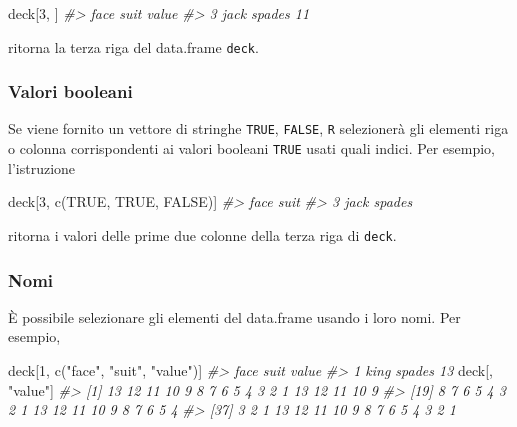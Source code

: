 \documentclass[
]{memoir}
\newenvironment{Shaded}{\begin{snugshade}}{\end{snugshade}}
\newcommand{\CommentTok}[1]{\textcolor[rgb]{0.56,0.35,0.01}{\textit{#1}}}
\newcommand{\ConstantTok}[1]{\textcolor[rgb]{0.00,0.00,0.00}{#1}}
\newcommand{\DecValTok}[1]{\textcolor[rgb]{0.00,0.00,0.81}{#1}}
\newcommand{\FunctionTok}[1]{\textcolor[rgb]{0.00,0.00,0.00}{#1}}
\newcommand{\NormalTok}[1]{#1}
\newcommand{\StringTok}[1]{\textcolor[rgb]{0.31,0.60,0.02}{#1}}
\theoremstyle{definition}
\theoremstyle{definition}
\theoremstyle{definition}
\theoremstyle{definition}
\theoremstyle{remark}
\begin{document}
\begin{Shaded}
\begin{Highlighting}[]
\NormalTok{deck[}\DecValTok{3}\NormalTok{, ]}
\CommentTok{\#\textgreater{}   face   suit value}
\CommentTok{\#\textgreater{} 3 jack spades    11}
\end{Highlighting}
\end{Shaded}

ritorna la terza riga del data.frame \texttt{deck}.

\hypertarget{valori-booleani}{%
\subsubsection{Valori booleani}\label{valori-booleani}}

Se viene fornito un vettore di stringhe \texttt{TRUE}, \texttt{FALSE}, \texttt{R} selezionerà
gli elementi riga o colonna corrispondenti ai valori booleani \texttt{TRUE}
usati quali indici. Per esempio, l'istruzione

\begin{Shaded}
\begin{Highlighting}[]
\NormalTok{deck[}\DecValTok{3}\NormalTok{, }\FunctionTok{c}\NormalTok{(}\ConstantTok{TRUE}\NormalTok{, }\ConstantTok{TRUE}\NormalTok{, }\ConstantTok{FALSE}\NormalTok{)]}
\CommentTok{\#\textgreater{}   face   suit}
\CommentTok{\#\textgreater{} 3 jack spades}
\end{Highlighting}
\end{Shaded}

ritorna i valori delle prime due colonne della terza riga di \texttt{deck}.

\hypertarget{nomi}{%
\subsubsection{Nomi}\label{nomi}}

È possibile selezionare gli elementi del data.frame usando i loro nomi.
Per esempio,

\begin{Shaded}
\begin{Highlighting}[]
\NormalTok{deck[}\DecValTok{1}\NormalTok{, }\FunctionTok{c}\NormalTok{(}\StringTok{"face"}\NormalTok{, }\StringTok{"suit"}\NormalTok{, }\StringTok{"value"}\NormalTok{)]}
\CommentTok{\#\textgreater{}   face   suit value}
\CommentTok{\#\textgreater{} 1 king spades    13}
\NormalTok{deck[, }\StringTok{"value"}\NormalTok{]}
\CommentTok{\#\textgreater{}  [1] 13 12 11 10  9  8  7  6  5  4  3  2  1 13 12 11 10  9}
\CommentTok{\#\textgreater{} [19]  8  7  6  5  4  3  2  1 13 12 11 10  9  8  7  6  5  4}
\CommentTok{\#\textgreater{} [37]  3  2  1 13 12 11 10  9  8  7  6  5  4  3  2  1}
\end{Highlighting}
\end{Shaded}
\end{document}
